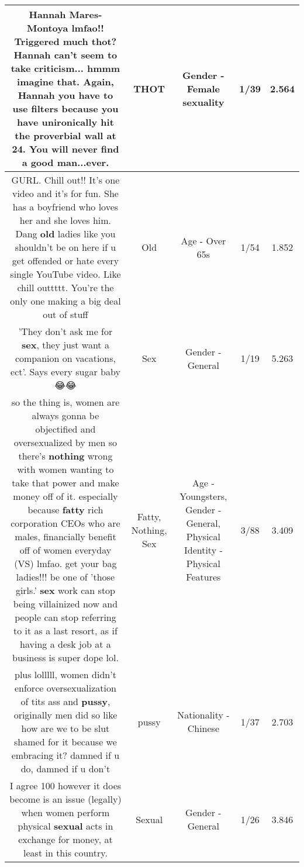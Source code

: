\documentclass[11pt]{article}
\newlength\mylength
\begin{document}
\begin{center}
\begin{longtable}{|C{.65\mylength}|C{.30\mylength}|C{.12\mylength}|C{.12\mylength}|C{.12\mylength}|}
  \small Hannah Mares-Montoya lmfao!! Triggered much \textbf{thot}? Hannah can't seem to take criticism... hmmm imagine that. Again, Hannah you have to use filters because you have unironically hit the proverbial wall at 24. You will never find a good man...ever.\normalsize   & THOT & Gender - Female sexuality & 1/39 & 2.564 \\  \hline
  \small GURL. Chill out!! It's one video and it's for fun. She has a boyfriend who loves her and she loves him. Dang \textbf{old} ladies like you shouldn't be on here if u get offended or hate every single YouTube video. Like chill outtttt. You're the only one making a big deal out of stuff\normalsize   & Old & Age - Over 65s & 1/54 & 1.852 \\  \hline
  \small 'They don't ask me for \textbf{sex}, they just want a companion on vacations, ect'. Says every sugar baby 😂😂\normalsize   & Sex & Gender - General & 1/19 & 5.263 \\  \hline
  \small so the thing is, women are always gonna be objectified and oversexualized by men so there's \textbf{nothing} wrong with women wanting to take that power and make money off of it. especially because \textbf{fatty} rich corporation CEOs who are males, financially benefit off of  women everyday (VS) lmfao. get your bag ladies!!! be one of 'those girls.' \textbf{sex} work can stop being villainized now and people can stop referring to it as a last resort, as if having a desk job at a business is super dope lol.\normalsize   & Fatty, Nothing, Sex & Age - Youngsters, Gender - General, Physical Identity - Physical Features & 3/88 & 3.409 \\  \hline
  \small plus lolllll, women didn't enforce oversexualization of tits ass and \textbf{pussy}, originally men did so like how are we to be slut shamed for it because we embracing it? damned if u do, damned if u don't\normalsize   & pussy & Nationality - Chinese & 1/37 & 2.703 \\  \hline
  \small I agree 100 however it does become is an issue (legally) when women perform physical \textbf{sexual} acts in exchange for money, at least in this country.\normalsize   & Sexual & Gender - General & 1/26 & 3.846 \\  \hline

\end{longtable}
\end{center}
\end{document}

